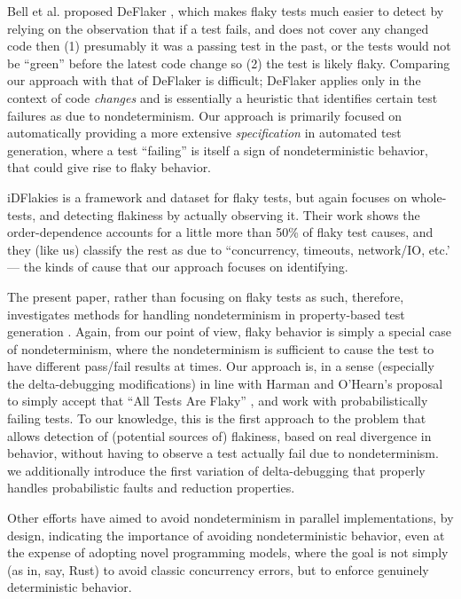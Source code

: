 Bell et al. proposed DeFlaker \cite{bell2018d}, which makes flaky tests much easier to detect by relying on the observation that if a test fails, and does not cover any changed code then (1) presumably it was a passing test in the past, or the tests would not be ``green'' before the latest code change so (2) the test is likely flaky.  Comparing our approach with that of DeFlaker is difficult; DeFlaker applies only in the context of code \emph{changes} and is essentially a heuristic that identifies certain test failures as due to nondeterminism.  Our approach is primarily focused on automatically providing a more extensive \emph{specification} in automated test generation, where a test ``failing'' is itself a sign of nondeterministic behavior, that could give rise to flaky behavior.

iDFlakies \cite{idflakies} is a framework and dataset for flaky tests, but again focuses on whole-tests, and detecting flakiness by actually observing it.  Their work shows the order-dependence accounts for a little more than 50\% of flaky test causes, and they (like us) classify the rest as due to ``concurrency, timeouts,
network/IO, etc.' --- the kinds of cause that our approach focuses on identifying.

The present paper, rather than focusing on flaky tests as such, therefore, investigates methods for handling nondeterminism in property-based test generation \cite{ClaessenH00,Papadakis:2011:PIT:2034654.2034663}.  Again, from our point of view, flaky behavior is simply a special case of nondeterminism, where the nondeterminism is sufficient to cause the test to have different pass/fail results at times.  Our approach is, in a sense (especially the delta-debugging modifications) in line with Harman and O'Hearn's proposal to simply accept that ``All Tests Are Flaky'' \cite{StartupstoScaleups}, and work with probabilistically failing tests.  To our
knowledge, this is the first approach to the problem that
allows detection of (potential sources of) flakiness, based on real divergence in
behavior, without having to observe a test actually fail due to
nondeterminism.  we additionally introduce the first variation of
delta-debugging that properly handles probabilistic faults and
reduction properties.

Other efforts \cite{ParallelDeterministic} have aimed to avoid nondeterminism in parallel implementations, by design, indicating the importance of avoiding nondeterministic behavior, even at the expense of adopting novel programming models, where the goal is not simply (as in, say, Rust) to avoid classic concurrency errors, but to enforce genuinely deterministic behavior.

